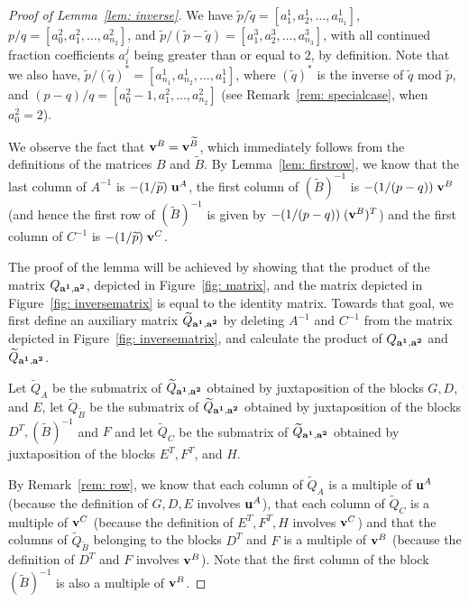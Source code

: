\documentclass[10pt,a4paper]{amsart}
\begin{document}
 \begin{proof} [Proof of Lemma~\ref{lem: inverse}]  
We have $\widetilde{p}/\widetilde{q}=[a^1_1, a^1_2, \ldots, a^1_{n_1}]$,  $p/q=[a^2_0, a^2_1, \ldots, a^2_{n_2}]$, and $\widetilde{p}/(\widetilde{p}-\widetilde{q})=[a^3_1, a^3_2, \ldots, a^3_{n_3}]$, with all continued fraction coefficients $a^j_i$ being greater than or equal to $2$, by definition. Note that we also have, $\widetilde{p}/(\widetilde{q})^*=[a^1_{n_1}, a^1_{n_2}, \ldots, a^1_1]$, where $(\widetilde{q})^*$ is the inverse of $\widetilde{q}$ mod $\widetilde{p}$,    and $(p-q)/q=[a^2_0-1, a^2_1, \ldots, a^2_{n_2}]$ (see Remark~\ref{rem: specialcase}, when $a^2_0=2$). 

We observe the fact that ${\bf v}^B={\bf v}^{\widetilde{B}}$, which immediately follows from the definitions of the matrices $B$ and $\widetilde{B}$.  By Lemma~\ref{lem: firstrow},  we know that the last column of $A^{-1}$ is  $-(1/\widetilde{p})\;  {\bf u}^A$,   the first column of  $(\widetilde{B})^{-1}$ is  $-(1/(p-q)) \; {\bf v}^B$ (and hence the first row of 
$(\widetilde{B})^{-1}$ is given by $-(1/(p-q)) \; ({\bf v}^B)^T$) and  the first column of  $C^{-1}$ is  $-(1/\widetilde{p})\;  {\bf v}^C$.

The proof of the lemma will be achieved by showing that the product of the matrix $Q_{{\bf a^1}, {\bf a^2}}$, depicted in Figure~\ref{fig: matrix}, and the matrix depicted in Figure~\ref{fig: inversematrix} is equal to the identity matrix. Towards that goal, we first define an auxiliary matrix $\widetilde{Q}_{{\bf a^1}, {\bf a^2}}$ by deleting $A^{-1}$ and $C^{-1}$ from the matrix depicted in Figure~\ref{fig: inversematrix}, and calculate the product of $Q_{{\bf a^1}, {\bf a^2}}$ and  $\widetilde{Q}_{{\bf a^1}, {\bf a^2}}$. 

Let $\widetilde{Q}_A$ be the submatrix of $\widetilde{Q}_{{\bf a^1}, {\bf a^2}}$ obtained by juxtaposition of the blocks $G, D$, and $E$, let $\widetilde{Q}_{\widetilde{B}}$ be the submatrix of  $\widetilde{Q}_{{\bf a^1}, {\bf a^2}}$  obtained by juxtaposition of the blocks  $D^T, (\widetilde{B})^{-1}$ and $F$ and let $\widetilde{Q}_C$ be the submatrix of  $\widetilde{Q}_{{\bf a^1}, {\bf a^2}}$ obtained by juxtaposition of the blocks  $E^T, F^T$, and $H$.

By Remark~\ref{rem: row}, we know that each column of $\widetilde{Q}_A$ is a multiple of ${\bf u}^A$ (because  the definition of $G, D, E$ involves ${\bf u}^A$), that each column of $\widetilde{Q}_C$ is a multiple of ${\bf v}^C$ (because  the definition of $E^T, F^T, H$  involves ${\bf v}^C$) and that the columns of $\widetilde{Q}_{\widetilde{B}}$ belonging to the blocks $D^T$ and  $F$  is a multiple of ${\bf v}^B$ (because the definition of $D^T$ and  $F$  involves ${\bf v}^B$). 
Note that the first column of the block $(\widetilde{B})^{-1}$ is also a multiple of ${\bf v}^B$.   


\end{proof}
\end{document}

